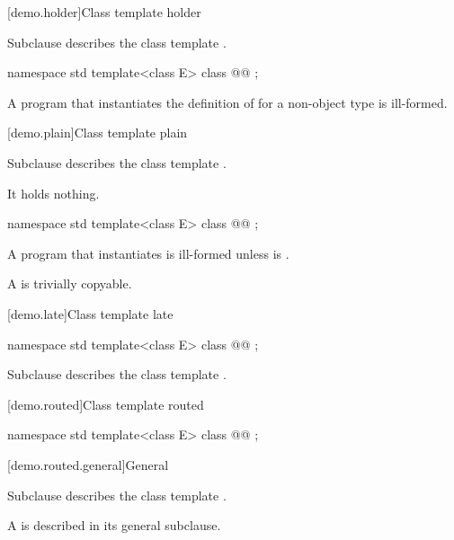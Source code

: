 [demo.holder]{Class template holder}

\pnum
Subclause  describes the class template .

\begin{codeblock}
namespace std {
  template<class E>
  class @@ {};
}
\end{codeblock}

\pnum
A program that instantiates the definition of  for a non-object type is ill-formed.

[demo.plain]{Class template plain}

\pnum
Subclause  describes the class template .

\pnum
It holds nothing.

\begin{codeblock}
namespace std {
  template<class E>
  class @@ {};
}
\end{codeblock}

\pnum
A program that instantiates  is ill-formed unless  is .

\pnum
\remarks
A  is trivially copyable.

[demo.late]{Class template late}

\begin{codeblock}
namespace std {
  template<class E>
  class @@ {};
}
\end{codeblock}

\pnum
Subclause  describes the class template .

[demo.routed]{Class template routed}

\begin{codeblock}
namespace std {
  template<class E>
  class @@ {};
}
\end{codeblock}

[demo.routed.general]{General}

\pnum
Subclause  describes the class template .

\pnum
\remarks
A  is described in its general subclause.
